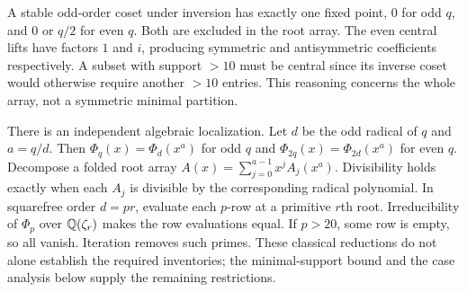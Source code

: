 \documentclass[11pt]{article}
\begin{document}
A stable odd-order coset under inversion has exactly one fixed point, $0$ for odd $q$, and $0$ or $q/2$ for even $q$. Both are excluded in the root array. The even central lifts have factors $1$ and $i$, producing symmetric and antisymmetric coefficients respectively. A subset with support $>10$ must be central since its inverse coset would otherwise require another $>10$ entries. This reasoning concerns the whole array, not a symmetric minimal partition.

There is an independent algebraic localization. Let $d$ be the odd radical of $q$ and $a=q/d$. Then $\Phi_q(x)=\Phi_d(x^a)$ for odd $q$ and $\Phi_{2q}(x)=\Phi_{2d}(x^a)$ for even $q$. Decompose a folded root array $A(x)=\sum_{j=0}^{a-1}x^j A_j(x^a)$. Divisibility holds exactly when each $A_j$ is divisible by the corresponding radical polynomial. In squarefree order $d=pr$, evaluate each $p$-row at a primitive $r$th root. Irreducibility of $\Phi_p$ over $\mathbb Q(\zeta_r)$ makes the row evaluations equal. If $p>20$, some row is empty, so all vanish. Iteration removes such primes. These classical reductions do not alone establish the required inventories; the minimal-support bound and the case analysis below supply the remaining restrictions.
\end{document}
